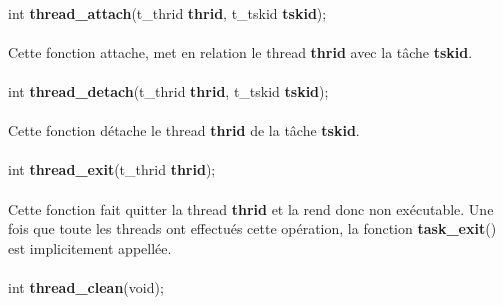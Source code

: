 \documentclass[10pt,a4wide]{article}
\begin{document}
\paragraph{}

\hspace{1.5cm}int \textbf{thread\_attach}(t\_thrid \textbf{thrid},
                                          t\_tskid \textbf{tskid});

\paragraph{}

Cette fonction attache, met en relation le thread \textbf{thrid} avec
la t\^ache \textbf{tskid}.

\paragraph{}

\hspace{1.5cm}int \textbf{thread\_detach}(t\_thrid \textbf{thrid},
                                          t\_tskid \textbf{tskid});

\paragraph{}

Cette fonction d\'etache le thread \textbf{thrid} de la t\^ache
\textbf{tskid}.

\paragraph{}

\hspace{1.5cm}int \textbf{thread\_exit}(t\_thrid \textbf{thrid});

\paragraph{}

Cette fonction fait quitter la thread \textbf{thrid} et la rend donc
non ex\'ecutable. Une fois que toute les threads ont effectu\'es cette
op\'eration, la fonction \textbf{task\_exit}() est implicitement
appell\'ee.

\paragraph{}

\hspace{1.5cm}int \textbf{thread\_clean}(void);
\end{document}
